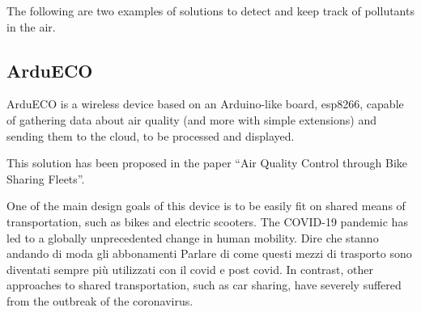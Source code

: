 

	
	
	The following are two examples of solutions to detect and keep track of pollutants in the air.
	
	\subsection{ArduECO}

		
		ArduECO is a wireless device based on an Arduino-like board, esp8266, capable of gathering data about air quality (and more with simple extensions) and sending them to the cloud, to be processed and displayed.
		
		This solution has been proposed in the paper ``Air Quality Control through Bike Sharing Fleets''\cite{ardueco_paper}.
		
		One of the main design goals of this device is to be easily fit on shared means of transportation, such as bikes and electric scooters.
		The COVID-19 pandemic has led to a globally unprecedented change in human mobility.
		Dire che stanno andando di moda gli abbonamenti
		Parlare di come questi mezzi di trasporto sono diventati sempre più utilizzati con il covid e post covid.
		In contrast, other approaches to shared transportation, such as car sharing, have severely suffered from the outbreak of the coronavirus.
		
